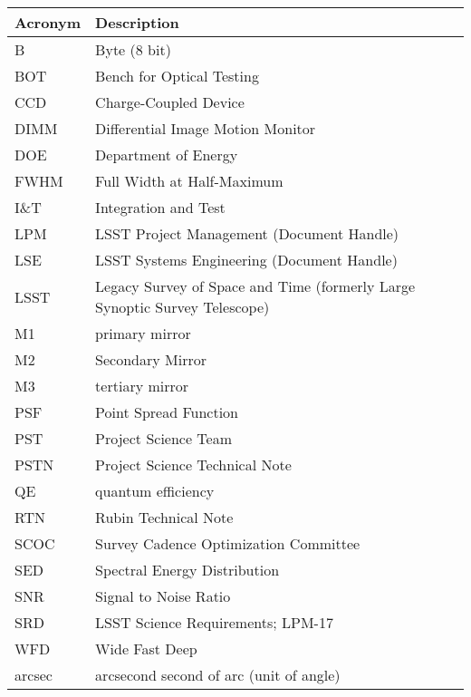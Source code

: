 \addtocounter{table}{-1}
\begin{longtable}{p{}p{}}\hline
\textbf{Acronym} & \textbf{Description}  \\\hline

B & Byte (8 bit) \\\hline
BOT & Bench for Optical Testing \\\hline
CCD & Charge-Coupled Device \\\hline
DIMM & Differential Image Motion Monitor \\\hline
DOE & Department of Energy \\\hline
FWHM & Full Width at Half-Maximum \\\hline
I\&T & Integration and Test \\\hline
LPM & LSST Project Management (Document Handle) \\\hline
LSE & LSST Systems Engineering (Document Handle) \\\hline
LSST & Legacy Survey of Space and Time (formerly Large Synoptic Survey Telescope) \\\hline
M1 & primary mirror \\\hline
M2 & Secondary Mirror \\\hline
M3 & tertiary mirror \\\hline
PSF & Point Spread Function \\\hline
PST & Project Science Team \\\hline
PSTN & Project Science Technical Note \\\hline
QE & quantum efficiency \\\hline
RTN & Rubin Technical Note \\\hline
SCOC & Survey Cadence Optimization Committee \\\hline
SED & Spectral Energy Distribution \\\hline
SNR & Signal to Noise Ratio \\\hline
SRD & LSST Science Requirements; LPM-17 \\\hline
WFD & Wide Fast Deep \\\hline
arcsec & arcsecond second of arc (unit of angle) \\\hline
\end{longtable}
